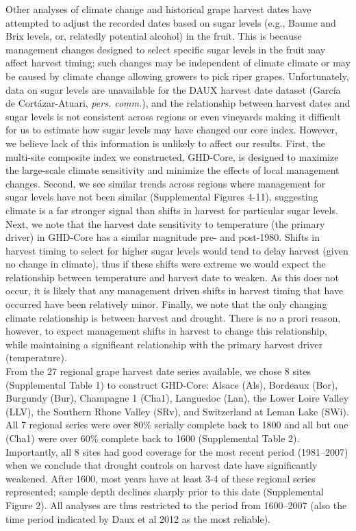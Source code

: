 \documentclass[final]{nature}
\begin{document}
\begin{methods}
\indent Other analyses of climate change and historical grape harvest dates have attempted to adjust the recorded dates based on sugar levels (e.g., Baume and Brix levels, or, relatedly potential alcohol) in the fruit\cite{webb2012}. This is because management changes designed to select specific sugar levels in the fruit may affect harvest timing; such changes may be independent of climate climate or may be caused by climate change allowing growers to pick riper grapes\cite{vanLeeuwen2016}. Unfortunately, data on sugar levels are unavailable for the DAUX harvest date dataset (Garc\'ia de Cort\'azar-Atuari, \emph{pers. comm.}), and the relationship between harvest dates and sugar levels is not consistent across regions or even vineyards\cite{Cortazar-Atauri:2010um} making it difficult for us to estimate how sugar levels may have changed our core index. However, we believe lack of this information is unlikely to affect our results. First, the multi-site composite index we constructed, GHD-Core, is designed to maximize the large-scale climate sensitivity and minimize the effects of local management changes. Second, we see similar trends across regions where management for sugar levels have not been similar (Supplemental Figures 4-11), suggesting climate is a far stronger signal than shifts in harvest for particular sugar levels. Next, we note that the harvest date sensitivity to temperature (the primary driver) in GHD-Core has a similar magnitude pre- and post-1980. Shifts in harvest timing to select for higher sugar levels would tend to delay harvest (given no change in climate), thus if these shifts were extreme we would expect the relationship between temperature and harvest date to weaken. As this does not occur, it is likely that any management driven shifts in harvest timing that have occurred have been relatively minor. Finally, we note that the only changing climate relationship is between harvest and drought. There is no a prori reason, however, to expect management shifts in harvest to change this relationship, while maintaining a significant relationship with the primary harvest driver (temperature).\\
\indent From the 27 regional grape harvest date series available, we chose 8 sites (Supplemental Table 1) to construct GHD-Core: Alsace (Als), Bordeaux (Bor), Burgundy (Bur), Champagne 1 (Cha1), Languedoc (Lan), the Lower Loire Valley (LLV), the Southern Rhone Valley (SRv), and Switzerland at Leman Lake (SWi). All 7 regional series were over $80\%$ serially complete back to 1800 and all but one (Cha1) were over $60\%$ complete back to 1600 (Supplemental Table 2). Importantly, all 8 sites had good coverage for the most recent period (1981--2007) when we conclude that drought controls on harvest date have significantly weakened. After 1600, most years have at least 3-4 of these regional series represented; sample depth declines sharply prior to this date (Supplemental Figure 2). All analyses are thus restricted to the period from 1600--2007 (also the time period indicated by Daux et al 2012 as the most reliable).\\

\end{methods}
\end{document}
